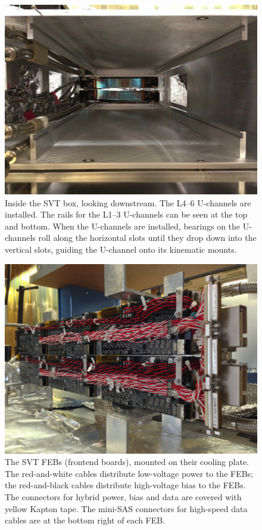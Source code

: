 \begin{figure}[ht]
    \includegraphics[angle=90,width=\textwidth]{detector/figs/drawers}
    \caption{Inside the SVT box, looking downstream.
    The L4--6 U-channels are installed.
The rails for the L1--3 U-channels can be seen at the top and bottom. When the U-channels are installed, bearings on the U-channels roll along the horizontal slots until they drop down into the vertical slots, guiding the U-channel onto its kinematic mounts.}
    \label{fig:drawers}
\end{figure}

\begin{figure}[ht]
    \includegraphics[width=\textwidth]{detector/figs/febplate}
    \caption{The SVT FEBs (frontend boards), mounted on their cooling plate. The red-and-white cables distribute low-voltage power to the FEBs; the red-and-black cables distribute high-voltage bias to the FEBs. The connectors for hybrid power, bias and data are covered with yellow Kapton tape. The mini-SAS connectors for high-speed data cables are at the bottom right of each FEB.}
    \label{fig:febplate}
\end{figure}


